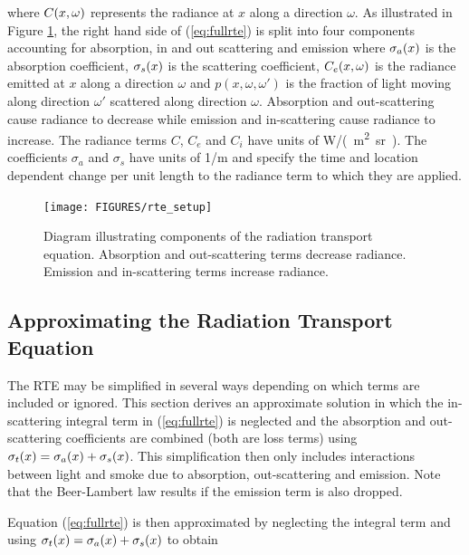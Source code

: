 \noindent where  $C(x,\omega)$ represents the  radiance at $x$ along a
direction $\omega$. As illustrated in Figure \ref{figRadiance},
the right hand side of (\ref{eq:fullrte}) is split into four
components accounting for absorption, in and out scattering and
emission where $\sigma_a(x)$ is the absorption coefficient, $\sigma_s(x)$ is
the scattering coefficient, $C_e(x,\omega)$ is the radiance emitted at $x$
along a direction $\omega$ and $p(x,\omega,\omega')$ is the
fraction of light moving along direction $\omega'$ scattered along
direction $\omega$. Absorption and out-scattering cause radiance
to decrease while emission and in-scattering cause radiance to
increase. The radiance terms $C$, $C_e$ and $C_i$ have units of
\si{W/(m^2.sr)}. The coefficients $\sigma_a$ and $\sigma_s$ have
units of \si{1/m} and specify the time and location dependent change
per unit length to the radiance term to which they are applied.

\begin{figure}[\figoptions]
\begin{center}
\texttt{[image: FIGURES/rte\_setup]}
\end{center}
\caption[Diagram illustrating components of the radiation
transport equation]{Diagram illustrating components of the
radiation transport equation.  Absorption and out-scattering terms
decrease radiance.  Emission and in-scattering terms increase
radiance.} \label{figRadiance}
\end{figure}


\subsection{Approximating the Radiation Transport Equation}

The RTE may be simplified in several ways depending on which terms are included or ignored.  This section derives an approximate solution in which the in-scattering integral term in (\ref{eq:fullrte}) is neglected and the absorption and out-scattering coefficients are combined (both are loss terms) using $\sigma_t(x)=\sigma_a(x)+\sigma_s(x)$.  This simplification then only includes interactions between light and smoke due to absorption,  out-scattering and emission.  Note that the Beer-Lambert law results if the emission term is also dropped.

Equation (\ref{eq:fullrte}) is then approximated by neglecting the integral term and using $\sigma_t(x)=\sigma_a(x)+\sigma_s(x)$ to obtain

